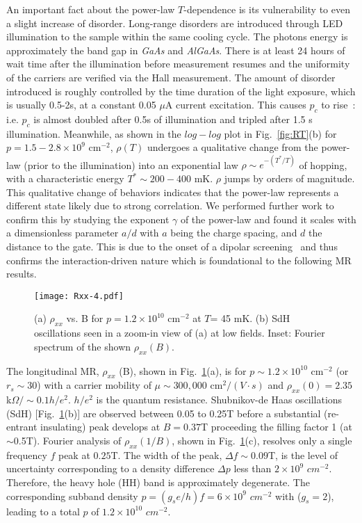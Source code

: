 \documentclass[twocolumn,secnumarabic,amssymb, nobibnotes, aps, prd]{revtex4-1}
\begin{document}
An important fact about the power-law $T$-dependence is its vulnerability to even a slight increase of disorder. Long-range disorders are introduced through LED illumination to the sample within the  same cooling cycle. The photons energy is approximately the band gap in {\it GaAs} and {\it AlGaAs}. There is at least 24 hours of wait time after the illumination before measurement resumes and the uniformity of the carriers are verified via the Hall measurement. The amount of disorder introduced is roughly controlled by the time duration of the light exposure, which is usually 0.5-2s, at a constant 0.05 $\mu$A current excitation. This causes $p_c$ to rise~\cite{jianlight}: i.e. $p_c$ is almost doubled after 0.5s of illumination and tripled after 1.5 s illumination. Meanwhile, as shown in the $log-log$ plot in Fig.~\ref{fig:RT}(b) for $p=1.5-2.8\times10^{9}$ cm$^{-2}$, $\rho(T)$ undergoes a qualitative change from the power-law (prior to the illumination) into an exponential law $\rho\sim e^{-(T^*/T)}$ of hopping, with a characteristic energy $T^*\sim200-400$ mK. $\rho$ jumps by orders of magnitude. This qualitative change of behaviors indicates that the power-law represents a different state likely due to strong correlation. We performed further work to confirm this by studying the exponent $\gamma$ of the power-law and found it scales with a dimensionless parameter $a/d$ with $a$ being the charge spacing, and $d$  the distance to the gate. This is due to the onset of a dipolar screening~\cite{jian-screen} and thus confirms the interaction-driven nature which is foundational to the following MR results.  

\begin{figure}[t]
 \centering
 \texttt{[image: Rxx-4.pdf]}
 \caption{\label{fig:Rxx} (a) $\rho_{xx}$ vs. B for $p=1.2\times10^{10}$ cm$^{-2}$ at $T$= 45 mK. (b) SdH oscillations seen in a zoom-in view of (a) at low fields. Inset: Fourier spectrum of the shown $\rho_{xx}(B)$.}
 \vspace{-10pt}
\end{figure}

The longitudinal MR, $\rho_{xx}$ (B), shown in Fig.~\ref{fig:Rxx}(a), is for $p\sim1.2\times10^{10}$ cm$^{-2}$ (or $r_s\sim30$) with a carrier mobility of $\mu\sim300,000$ cm$^{2}/(V\cdot s)$ and $\rho_{xx}(0)=2.35$ k$\Omega/\sim0.1h/e^2$. $h/e^2$ is the quantum resistance. Shubnikov-de Haas oscillations (SdH) [Fig.~\ref{fig:Rxx}(b)] are observed between 0.05 to 0.25T before a substantial (re-entrant insulating) peak develops at $B=0.37$T proceeding the filling factor 1 (at $\sim$0.5T). %
Fourier analysis of $\rho_{xx}(1/B)$, shown in Fig.~\ref{fig:Rxx}(c),  resolves only a single frequency $f$ peak at $0.25$T. The width of the peak, $\Delta f\sim0.09$T, is the level of uncertainty corresponding to a density difference $\Delta p$ less than $2\times10^{9}$ $cm^{-2}$. Therefore, the heavy hole (HH) band is approximately degenerate. The corresponding subband density $p=(g_s e/h)f=6\times10^{9}$ $cm^{-2}$ with ($g_s=2$), leading to a total $p$ of $1.2\times10^{10}$ $cm^{-2}$. 
\end{document}
